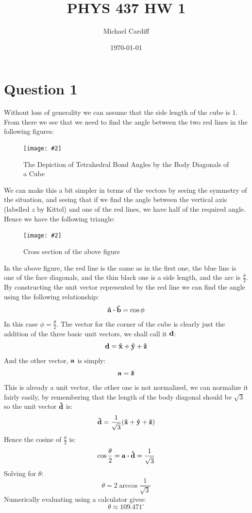 \documentclass[12pt]{article}
\title{PHYS 437 HW 1}
\author{Michael Cardiff}
\date{\today}
\newcommand{\fig}[3]{
  \begin{figure}[H]
    \centering\texttt{[image: \#2]}\caption{#3}
  \end{figure}}
\begin{document}
\maketitle
\section*{Question 1}
Without loss of generality we can assume that the side length of the cube is 1. From there we see that we need to find the angle between the two red lines in the following figures:
\fig{8.0}{tetrahedral.png}{The Depiction of Tetrahedral Bond Angles by the Body Diagonals of a Cube}
We can make this a bit simpler in terms of the vectors by seeing the symmetry of the situation, and seeing that if we find the angle between the vertical axis (labelled $z$ by Kittel) and one of the red lines, we have half of the required angle. Hence we have the following triangle:
\fig{5.0}{triangle1.png}{Cross section of the above figure}
In the above figure, the red line is the same as in the first one, the blue line is one of the face diagonals, and the thin black one is a side length, and the arc is $\frac{\theta}{2}$. By constructing the unit vector represented by the red line we can find the angle using the following relationship:
\begin{equation*}
  \vb{\hat{a}}\vdot\vb{\hat{b}}=\cos\phi
\end{equation*}
In this case $\phi=\frac{\theta}{2}$. The vector for the corner of the cube is clearly just the addition of the three basic unit vectors, we shall call it $\vb{d}$:
\begin{equation*}
  \vb{d}=\vb{\hat{x}+\hat{y}+\hat{z}}
\end{equation*}
And the other vector, $\vb{a}$ is simply:
\begin{equation*}
  \vb{a}=\vb{\hat{z}}
\end{equation*}
This is already a unit vector, the other one is not normalized, we can normalize it fairly easily, by remembering that the length of the body diagonal should be $\sqrt{3}$ so the unit vector $\vb{\hat{d}}$ is:
\begin{equation*}
  \vb{\hat{d}}=\frac{1}{\sqrt{3}}\qty(\vb{\hat{x}+\hat{y}+\hat{z}})
\end{equation*}
Hence the cosine of $\frac{\theta}{2}$ is:
\begin{equation*}
  \cos\frac{\theta}{2}=\vb{a}\vdot\vb{\hat{d}}=\frac{1}{\sqrt{3}}
\end{equation*}
Solving for $\theta$:
\begin{equation*}
  \theta=2\arccos\frac{1}{\sqrt{3}}
\end{equation*}
Numerically evaluating using a calculator gives:
\begin{equation*}
  \boxed{\theta\approx109.471^\circ}
\end{equation*}
\end{document}
